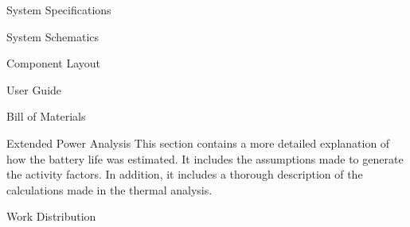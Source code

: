 \documentclass[12pt,letterpaper]{article}
\begin{document}




%

\listoftodos
\tableofcontents \newpage
\listoffigures \newpage
\listoftables \newpage
{}


%

%

%
%
%
%


%
%





\appendix
\addappheadtotoc

\begin{customAppendixPage}{System Specifications}
\lipsum[1]
\end{customAppendixPage}
\renewcommand*{\thepage}{\thesection-\arabic{page}}


\begin{customAppendixPage}{System Schematics}
\lipsum[1]
\end{customAppendixPage}
\renewcommand*{\thepage}{\thesection-\arabic{page}}


\begin{customAppendixPage}{Component Layout}
\lipsum[1]
\end{customAppendixPage}
\renewcommand*{\thepage}{\thesection-\arabic{page}}


\begin{customAppendixPage}{User Guide}
\lipsum[1]
\end{customAppendixPage}
\renewcommand*{\thepage}{\thesection-\arabic{page}}

\begin{customAppendixPage}{Bill of Materials}
\lipsum[1]
\end{customAppendixPage}
\renewcommand*{\thepage}{\thesection-\arabic{page}}


\begin{customAppendixPage}{Extended Power Analysis}
This section contains a more detailed explanation of how the battery life was estimated.  It includes the assumptions made to generate the activity factors.  In addition, it includes a thorough description of the calculations made in the thermal analysis.
\end{customAppendixPage}
\renewcommand*{\thepage}{\thesection-\arabic{page}}




\begin{customAppendixPage}{Work Distribution}
\lipsum[1]
\end{customAppendixPage}
\renewcommand*{\thepage}{\thesection-\arabic{page}}
\end{document}
